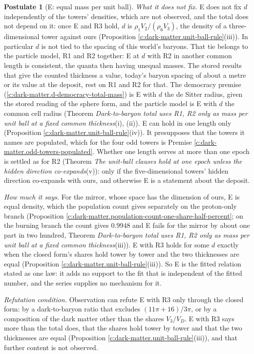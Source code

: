 \documentclass[11pt]{article}
\theoremstyle{definition}
\newtheorem{postulate}[theorem]{Postulate}
\theoremstyle{plain}
\begin{document}
\begin{postulate}[E: equal mass per unit ball]
\emph{What it does not fix.} E does not fix $d$ independently of the towers' densities, which are not observed, and the total does not depend on it: once E and R3 hold, $d$ is $\rho_{1}V_{2}/(\rho_{6}V_{3})$, the density of a three-dimensional tower against ours (Proposition \ref{c:dark-matter.unit-ball-rule}(iii)). In particular $d$ is not tied to the spacing of this world's baryons. That tie belongs to the particle model, R1 and R2 together: E at $d$ with R2 in another common length is consistent, the quanta then having unequal masses. The stored results that give the counted thickness a value, today's baryon spacing of about a metre or its value at the deposit, rest on R1 and R2 for that. The democracy premise (\ref{c:dark-matter.d-democracy-total-mass}) is E with $d$ the de Sitter radius, given the stored reading of the sphere form, and the particle model is E with $d$ the common cell radius (Theorem \emph{Dark-to-baryon total uses R1, R2 only as mass per unit ball at a fixed common thickness}(i), (ii)). E can hold in one length only (Proposition \ref{c:dark-matter.unit-ball-rule}(iv)). It presupposes that the towers it names are populated, which for the four odd towers is Premise \ref{c:dark-matter.odd-towers-populated}. Whether one length serves at more than one epoch is settled as for R2 (Theorem \emph{The unit-ball clauses hold at one epoch unless the hidden direction co-expands}(v)): only if the five-dimensional towers' hidden direction co-expands with ours, and otherwise E is a statement about the deposit.

\emph{How much it says.} For the mirror, whose space has the dimension of ours, E is equal density, which the population count gives separately on the proton-only branch (Proposition \ref{c:dark-matter.population-count-one-share-half-percent}; on the burning branch the count gives $0.9948$ and E fails for the mirror by about one part in two hundred, Theorem \emph{Dark-to-baryon total uses R1, R2 only as mass per unit ball at a fixed common thickness}(iii)). E with R3 holds for some $d$ exactly when the closed form's shares hold tower by tower and the two thicknesses are equal (Proposition \ref{c:dark-matter.unit-ball-rule}(iii)). So E is the fitted relation stated as one law: it adds no support to the fit that is independent of the fitted number, and the series supplies no mechanism for it.

\emph{Refutation condition.} Observation can refute E with R3 only through the closed form: by a dark-to-baryon ratio that excludes $(11\pi + 16)/3\pi$, or by a composition of the dark matter other than the shares $V_{3}/V_{D}$. E with R3 says more than the total does, that the shares hold tower by tower and that the two thicknesses are equal (Proposition \ref{c:dark-matter.unit-ball-rule}(iii)), and that further content is not observed.
\end{postulate}
\end{document}
